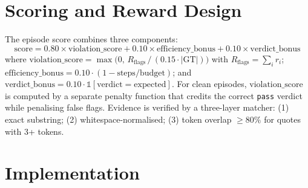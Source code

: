 \documentclass{article}
\begin{document}
\section{Scoring and Reward Design}
\label{sec:scoring}

The episode score combines three components:
\begin{equation}
  \text{score} = 0.80 \times \text{violation\_score}
               + 0.10 \times \text{efficiency\_bonus}
               + 0.10 \times \text{verdict\_bonus}
\end{equation}
where $\text{violation\_score} = \max\!\bigl(0,\, R_\text{flags}\,/\,
(0.15 \cdot |\text{GT}|)\bigr)$ with $R_\text{flags} = \sum_i r_i$;
$\text{efficiency\_bonus} = 0.10 \cdot (1 - \text{steps}/\text{budget})$;
and $\text{verdict\_bonus} = 0.10 \cdot \mathbb{1}[\text{verdict} =
\text{expected}]$.  For clean episodes, $\text{violation\_score}$ is
computed by a separate penalty function that credits the correct
\texttt{pass} verdict while penalising false flags.  Evidence is
verified by a three-layer matcher: (1) exact substring; (2)
whitespace-normalised; (3) token overlap $\geq 80\%$ for quotes with
3+ tokens.

\section{Implementation}
\label{sec:implementation}
\end{document}
